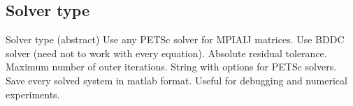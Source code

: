 \subsection{Solver type}
\begin{recordtype}{Solver type}{ (abstract)}
  Use any PETSc solver for MPIAIJ matrices.
  Use BDDC solver (need not to work with every equation).
 Absolute residual tolerance. 
 Maximum number of outer iterations.
 String with options for PETSc solvers.
 Save every solved system in matlab format. Useful for debugging and numerical experiments.
\end{recordtype}


